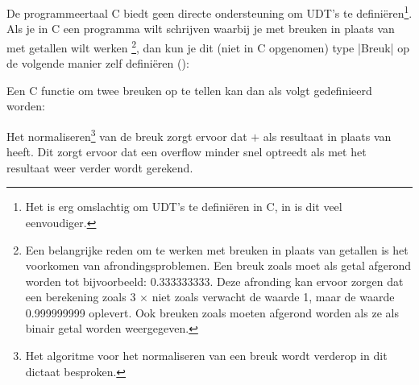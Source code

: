 \begin{cpplstShortInline}
De programmeertaal C biedt geen directe ondersteuning om UDT's te definiëren\footnote{%
	Het is erg omslachtig om UDT's te definiëren in C, in \Cpp{} is dit veel eenvoudiger.
}.
Als je in C een programma wilt schrijven waarbij je met breuken in plaats van met  getallen wilt werken%
\footnote{%
    Een belangrijke reden om te werken met breuken in plaats van  getallen is het voorkomen van afrondingsproblemen. 
    Een breuk zoals  moet als  getal afgerond worden tot bijvoorbeeld: 0.333333333. 
    Deze afronding kan ervoor zorgen dat een berekening zoals 3 $\times$  niet zoals verwacht de waarde 1, maar de waarde 0.999999999 oplevert. 
    Ook breuken zoals  moeten afgerond worden  als ze als binair  getal worden weergegeven.
}, dan kun je dit (niet in C opgenomen) type |Breuk| op de volgende manier zelf definiëren ():

Een C functie om twee breuken op te tellen kan dan als volgt gedefinieerd worden:

Het normaliseren\footnote{Het algoritme voor het normaliseren van een breuk wordt verderop in dit dictaat besproken.} van de breuk zorgt ervoor dat  $+$  als resultaat  in plaats van  heeft.
Dit zorgt ervoor dat een overflow minder snel optreedt als met het resultaat weer verder wordt gerekend.


\end{cpplstShortInline}
